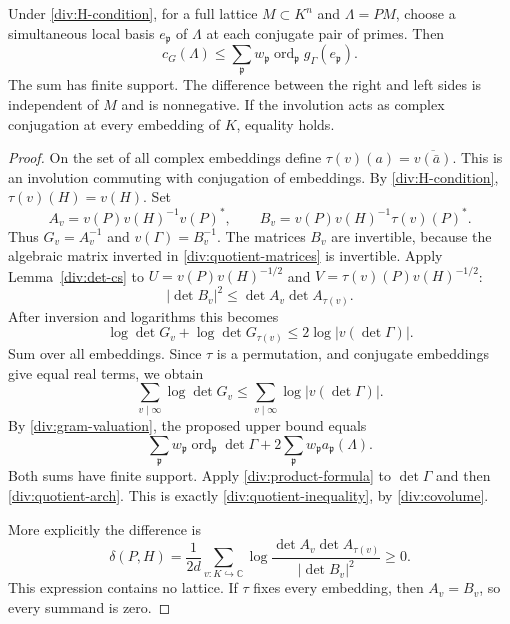 \begin{theorem}\label{div:quotient-covolume}
Under \eqref{div:H-condition}, for a full lattice $M\subset K^n$ and
$\Lambda=PM$, choose a simultaneous local basis $e_{\mathfrak p}$ of
$\Lambda$ at each conjugate pair of primes. Then
\begin{equation}\label{div:quotient-inequality}
 c_G(\Lambda)\le
 \sum_{\mathfrak p}w_{\mathfrak p}
       \operatorname{ord}_{\mathfrak p}g_\Gamma(e_{\mathfrak p}).
\end{equation}
The sum has finite support. The difference between the right and left
sides is independent of $M$ and is nonnegative. If the involution acts
as complex conjugation at every embedding of $K$, equality holds.
\end{theorem}
\begin{proof}
On the set of all complex embeddings define
$\tau(v)(a)=\overline{v(\bar a)}$. This is an involution commuting
with conjugation of embeddings. By \eqref{div:H-condition},
$\tau(v)(H)=v(H)$. Set
\[
 A_v=v(P)v(H)^{-1}v(P)^*,\qquad
 B_v=v(P)v(H)^{-1}\tau(v)(P)^*.
\]
Thus $G_v=A_v^{-1}$ and $v(\Gamma)=B_v^{-1}$.
The matrices $B_v$ are invertible, because the algebraic matrix inverted
in \eqref{div:quotient-matrices} is invertible. Apply
Lemma~\ref{div:det-cs} to
$U=v(P)v(H)^{-1/2}$ and $V=\tau(v)(P)v(H)^{-1/2}$:
\[
 |\det B_v|^2\le\det A_v\det A_{\tau(v)}.
\]
After inversion and logarithms this becomes
\[
 \log\det G_v+\log\det G_{\tau(v)}
       \le2\log|v(\det\Gamma)|.
\]
Sum over all embeddings. Since $\tau$ is a permutation, and conjugate
embeddings give equal real terms, we obtain
\begin{equation}\label{div:quotient-arch}
 \sum_{v\mid\infty}\log\det G_v
       \le\sum_{v\mid\infty}\log|v(\det\Gamma)|.
\end{equation}
By \eqref{div:gram-valuation}, the proposed upper bound equals
\[
 \sum_{\mathfrak p}w_{\mathfrak p}
       \operatorname{ord}_{\mathfrak p}\det\Gamma
       +2\sum_{\mathfrak p}w_{\mathfrak p}a_{\mathfrak p}(\Lambda).
\]
Both sums have finite support. Apply \eqref{div:product-formula} to
$\det\Gamma$ and then \eqref{div:quotient-arch}. This is exactly
\eqref{div:quotient-inequality}, by \eqref{div:covolume}.

More explicitly the difference is
\begin{equation}\label{div:quotient-defect}
 \delta(P,H)=\frac1{2d}\sum_{v:K\hookrightarrow\mathbb C}
 \log\frac{\det A_v\det A_{\tau(v)}}{|\det B_v|^2}\ge0.
\end{equation}
This expression contains no lattice. If $\tau$ fixes every embedding,
then $A_v=B_v$, so every summand is zero.
\end{proof}

